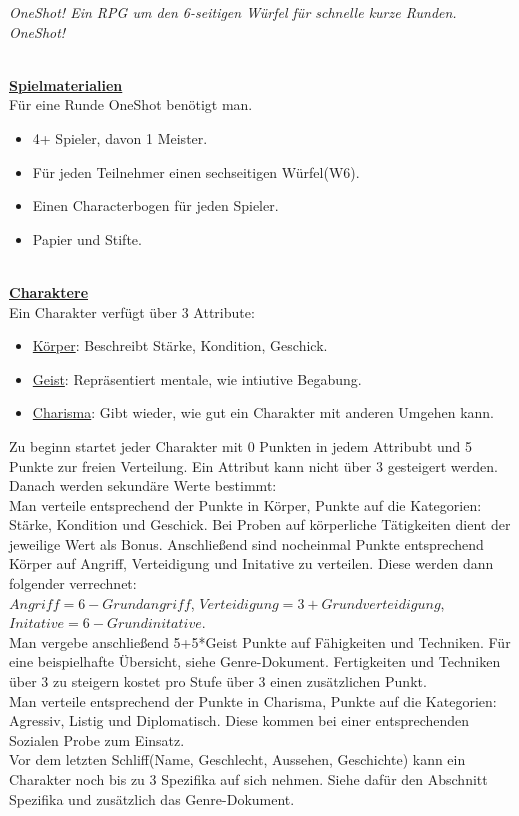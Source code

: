 \documentclass[twoside,a4paper]{minimal}
\begin{document}
\textit{OneShot! Ein RPG um den 6-seitigen Würfel für schnelle kurze Runden. OneShot!}
\setlength{\columnsep}{5pt}
\begin{multicols*}{3}
\textbf{\uline{\\Spielmaterialien}}
\\Für eine Runde OneShot benötigt man.
\begin{itemize}
\item 4+ Spieler, davon 1 Meister.
\item Für jeden Teilnehmer einen sechseitigen Würfel(W6).
\item Einen Characterbogen für jeden Spieler.
\item Papier und Stifte.
\end{itemize}
\textbf{\uline{\\Charaktere}}
\\Ein Charakter verfügt über 3 Attribute:
\begin{itemize}
\item \uline{Körper}: Beschreibt Stärke, Kondition, Geschick. 
\item \uline{Geist}: Repräsentiert mentale, wie intiutive Begabung.
\item \uline{Charisma}: Gibt wieder, wie gut ein Charakter mit anderen Umgehen kann.
\end{itemize}
Zu beginn startet jeder Charakter mit 0 Punkten in jedem Attribubt und 5 Punkte zur freien Verteilung. Ein Attribut kann nicht über 3 gesteigert werden. Danach werden sekundäre Werte bestimmt:
\\Man verteile entsprechend der Punkte in Körper, Punkte auf die Kategorien: Stärke, Kondition und Geschick. Bei Proben auf körperliche Tätigkeiten dient der jeweilige Wert als Bonus. Anschließend sind nocheinmal Punkte entsprechend Körper auf Angriff, Verteidigung und Initative zu verteilen. Diese werden dann folgender verrechnet:\\$Angriff=6-Grundangriff$, $Verteidigung=3+Grundverteidigung$, $Initative=6-Grundinitative$.
\\Man vergebe anschließend 5+5*Geist Punkte auf Fähigkeiten und Techniken. Für eine beispielhafte Übersicht, siehe Genre-Dokument. Fertigkeiten und Techniken über 3 zu steigern kostet pro Stufe über 3 einen zusätzlichen Punkt.
\\Man verteile entsprechend der Punkte in Charisma, Punkte auf die Kategorien: Agressiv, Listig und Diplomatisch. Diese kommen bei einer entsprechenden Sozialen Probe zum Einsatz.
\\Vor dem letzten Schliff(Name, Geschlecht, Aussehen, Geschichte) kann ein Charakter noch bis zu 3 Spezifika auf sich nehmen. Siehe dafür den Abschnitt Spezifika und zusätzlich das Genre-Dokument.

\end{multicols*}
\end{document}
